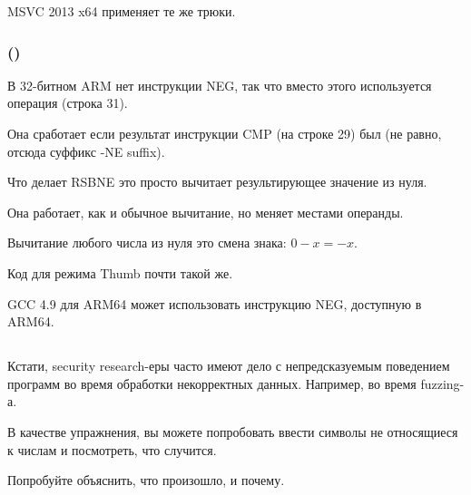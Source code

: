\Optimizing MSVC 2013 x64 применяет те же трюки.

\subsubsection{\OptimizingKeilVI (\ARMMode)}



В 32-битном ARM нет инструкции NEG, так что вместо этого используется операция 
(строка 31).

Она сработает если результат инструкции CMP (на строке 29) был  
(не равно, отсюда суффикс -NE suffix).

Что делает RSBNE это просто вычитает результирующее значение из нуля.

Она работает, как и обычное вычитание, но меняет местами операнды.

Вычитание любого числа из нуля это смена знака: $0-x=-x$.

Код для режима Thumb почти такой же.

GCC 4.9 для ARM64 может использовать инструкцию NEG, доступную в ARM64.

\subsection{\Exercise{}}


Кстати, security research-еры часто имеют дело с непредсказуемым поведением программ во время обработки некорректных данных.
Например, во время fuzzing-а.

В качестве упражнения, вы можете попробовать ввести символы не относящиеся к числам и посмотреть, что случится.

Попробуйте объяснить, что произошло, и почему.


